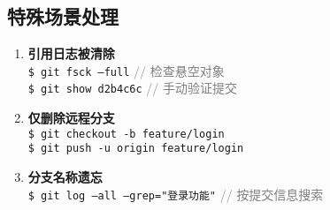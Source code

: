 \subsection{特殊场景处理}
\begin{enumerate}[leftmargin=*, nosep]
    \item \textbf{引用日志被清除} \\
    \texttt{\$ git fsck --full} \quad \textcolor{gray}{// 检查悬空对象} \\
    \texttt{\$ git show d2b4c6c} \quad \textcolor{gray}{// 手动验证提交}
    
    \item \textbf{仅删除远程分支} \\
    \texttt{\$ git checkout -b feature/login} \\
    \texttt{\$ git push -u origin feature/login}
    
    \item \textbf{分支名称遗忘} \\
    \texttt{\$ git log --all --grep="登录功能"} \quad \textcolor{gray}{// 按提交信息搜索}
\end{enumerate}

